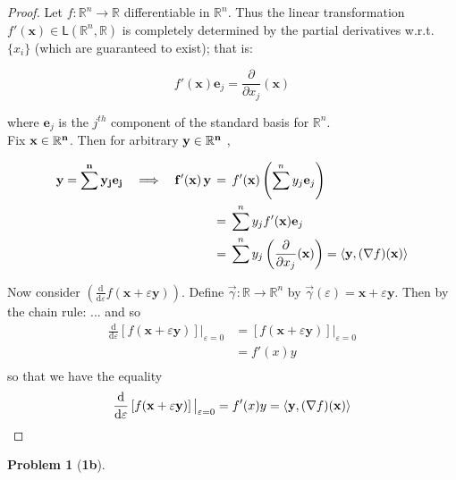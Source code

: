 \documentclass[10pt]{article}
\theoremstyle{plain}
\theoremstyle{definition}
\newtheorem*{prob*}{Problem}
\providecommand{\R}{\mathbb{R}}%
\numberwithin{equation}{section}
\renewcommand{\epsilon}{\varepsilon}
\begin{document}
\begin{proof}
  Let $f: \R^n \rightarrow \R $ differentiable in $\R^n$. Thus the linear transformation
  $f' ( \mathbf{x} ) \in \mathsf{L} ( \R^n , \R ) $ is completely determined by the partial derivatives w.r.t. $\{x_i\}$
  (which are guaranteed to exist); that is:
  
  \[
  f'(\mathbf{x})\mathbf{e}_j = \frac{\partial}{\partial x_j} (\mathbf{x})
  \]
  
  where $\mathbf{e}_j$ is the $j^{th}$ component of the standard basis for $\R^n$.\\
  
  Fix $\bf{x} \in \R^n$. Then for arbitrary $\bf{y} \in \R^n$ , \quad

  \[
  \begin{aligned}
    \bf{y} = \sum^{n}{y_j \bf{e}_j} \quad
  \Longrightarrow \quad f'(\mathbf{x}) \, \mathbf{y} \, &= \, f'(\mathbf{x})\left(\sum^{n} y_j \mathbf{e}_j\right)\\
    &= \, \sum^{n} y_j f'(\mathbf{x}) \mathbf{e}_j\\
    &= \, \sum^{n} y_j \left(\frac{\partial}{\partial x_j} (\mathbf{x})\right)
    = \langle \mathbf{y} , (\nabla f) (\mathbf{x}) \rangle \\
\end{aligned}
\]

Now consider $\displaystyle \left(\frac{\mathrm{d}}{\mathrm{d}\epsilon} f(\mathbf{x} + \epsilon \mathbf{y})\right)$.
Define $\vec{\gamma} : \R \rightarrow \R^n $ by $\vec{\gamma}(\epsilon) = \mathbf{x} + \epsilon \mathbf{y}.$ Then by the chain rule:
...
and so
\[
\begin{aligned}
\frac{\mathrm{d}}{\mathrm{d} \epsilon} \left[ f(\mathbf{x} + \epsilon \mathbf{y}) \right] \big|_{\epsilon=0}
&= \left[ f(\mathbf{x} + \epsilon \mathbf{y}) \right] \big|_{\epsilon=0} \\
&= f'(x) y \\
\end{aligned}
\]
so that we have the equality
\[
\frac{\mathrm{d}}{\mathrm{d} \epsilon} \left[ f(\mathbf{x} + \epsilon \mathbf{y}) \right] \big|_{\epsilon=0}
= f'(x) y
= \langle \mathbf{y} , (\nabla f) (\mathbf{x}) \rangle \\
\]
\qedhere  
\end{proof}
\clearpage
\begin{prob*}[\bf{1b}]
\end{prob*}
\end{document}
